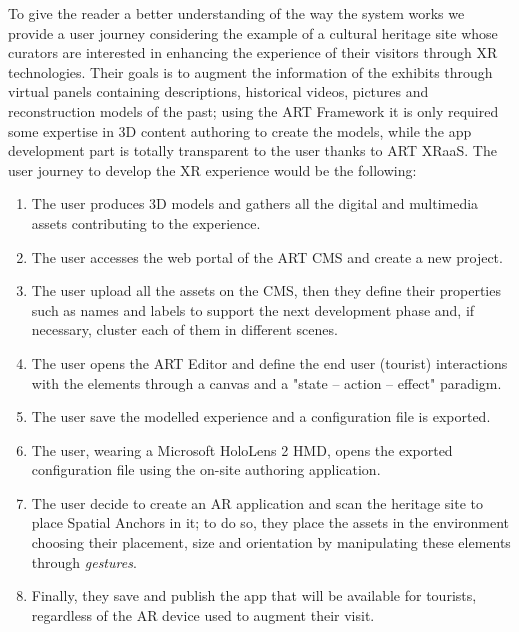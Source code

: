 To give the reader a better understanding of the way the system works we provide a user journey considering the example of a cultural heritage site whose curators are interested in enhancing the experience of their visitors through \gls{XR} technologies. Their goals is to augment the information of the exhibits through virtual panels containing descriptions, historical videos, pictures and reconstruction models of the past; using the ART Framework it is only required some expertise in 3D content authoring to create the models, while the app development part is totally transparent to the user thanks to ART XRaaS. The user journey to develop the \gls{XR} experience would be the following:
\begin{enumerate}
    \item The user produces 3D models and gathers all the digital and multimedia assets contributing to the experience.
    \item The user accesses the web portal of the ART CMS and create a new project.
    \item The user upload all the assets on the CMS, then they define their properties such as names and labels to support the next development phase and, if necessary, cluster each of them in different scenes.
    \item The user opens the ART Editor and define the end user (tourist) interactions with the elements through a canvas and a "state – action – effect" paradigm.
    \item The user save the modelled experience and a configuration file is exported.
    \item The user, wearing a Microsoft HoloLens 2 \gls{HMD}, opens the exported configuration file using the on-site authoring application.
    \item The user decide to create an \gls{AR} application and scan the heritage site to place Spatial Anchors in it; to do so, they place the assets in the environment choosing their placement, size and orientation by manipulating these elements through \emph{gestures}.
    \item Finally, they save and publish the app that will be available for tourists, regardless of the \gls{AR} device used to augment their visit.
\end{enumerate}